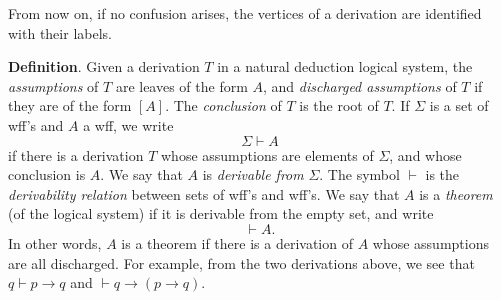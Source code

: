 \documentclass[12pt]{article}
\begin{document}
From now on, if no confusion arises, the vertices of a derivation are identified with their labels.

\textbf{Definition}.  Given a derivation $T$ in a natural deduction logical system, the \emph{assumptions} of $T$ are leaves of the form $A$, and \emph{discharged assumptions} of $T$ if they are of the form $[A]$.  The \emph{conclusion} of $T$ is the root of $T$.  If $\Sigma$ is a set of wff's and $A$ a wff, we write $$\Sigma \vdash A$$ if there is a derivation $T$ whose assumptions are elements of $\Sigma$, and whose conclusion is $A$.  We say that $A$ is \emph{derivable from} $\Sigma$.  The symbol $\vdash$ is the \emph{derivability relation} between sets of wff's and wff's.  We say that $A$ is a \emph{theorem} (of the logical system) if it is derivable from the empty set, and write $$\vdash A.$$
In other words, $A$ is a theorem if there is a derivation of $A$ whose assumptions are all discharged.  For example, from the two derivations above, we see that $q \vdash p\to q$ and $\vdash q\to (p\to q)$.

\end{document}

